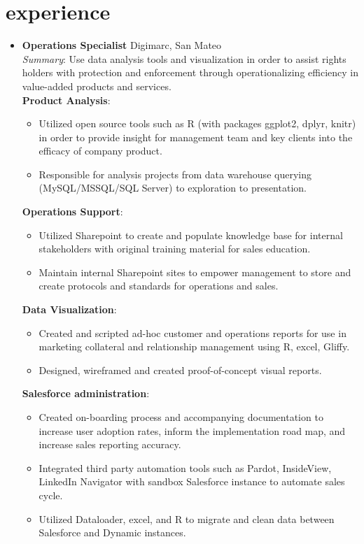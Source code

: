 \documentclass[]{friggeri-cv}
\renewenvironment{entrylist}{%
  \begin{itemize}[leftmargin=1in] %
}{%
  \end{itemize}
}
\renewcommand{\entry}[4]{%
  \item[#1]
    \textbf{#2}%
    \hfill%
    {\footnotesize\addfontfeature{Color=lightgray} #3}\\%
    #4\vspace{\parsep}%
  }
\begin{document}
\section{experience}

\begin{entrylist}
  \entry
    {07/14---curr.}
    {Operations Specialist}
    {Digimarc, San Mateo}
    {\textit{Summary}: Use data analysis tools and visualization in order to assist rights holders with protection and enforcement through operationalizing efficiency in value-added products and services.\\ 

\textbf {Product Analysis}: 
\begin{itemize}
\item Utilized open source tools such as R (with packages ggplot2, dplyr, knitr) in order to provide insight for management team and key clients into the efficacy of company product. 
\item Responsible for analysis projects from data warehouse querying (MySQL/MSSQL/SQL Server) to exploration to presentation. 
\end{itemize}

\textbf {Operations Support}:  
\begin{itemize}
\item Utilized Sharepoint to create and populate knowledge base for internal stakeholders with original training material for sales education. 
\item Maintain internal Sharepoint sites to empower management to store and create protocols and standards for operations and sales. 
\end{itemize}

\textbf {Data Visualization}: 
\begin{itemize}
\item Created and scripted ad-hoc customer and operations reports for use in marketing collateral and relationship management using R, excel, Gliffy. 
\item Designed, wireframed and created proof-of-concept visual reports. 
\end{itemize}



\textbf {Salesforce administration}: 
\begin{itemize}
\item Created on-boarding process and accompanying documentation to increase user adoption rates, inform the implementation road map, and increase sales reporting accuracy.
\item Integrated third party automation tools such as Pardot, InsideView, LinkedIn Navigator with sandbox Salesforce instance to automate sales cycle. 
\item Utilized Dataloader, excel, and R to migrate and clean data between Salesforce and Dynamic instances.
\end{itemize}
}
  


\end{entrylist}
\end{document}
